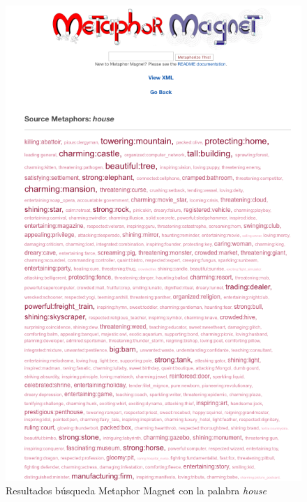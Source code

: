 \begin{figure}[!h]
	\includegraphics[width=.6\textwidth]{Imagenes/Bitmap/Capitulo2/metaphormagnet.png}
	\centering
	\caption{Resultados búsqueda Metaphor Magnet con la palabra \textit{house}}
	\label{fig:metaphormagnet}
\end{figure}


